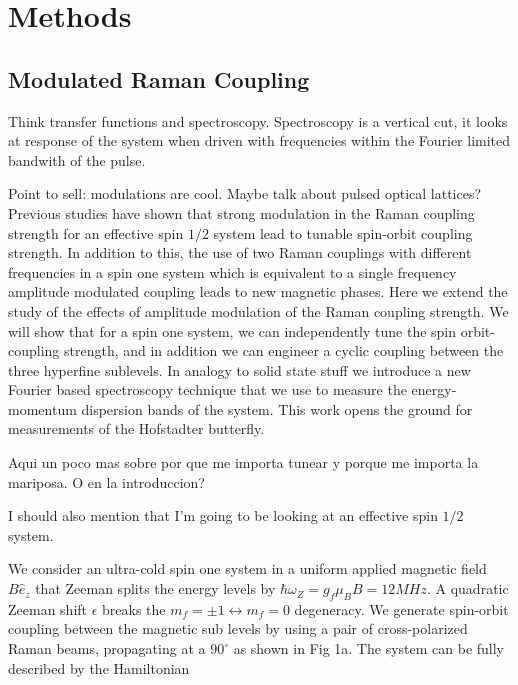 \section{Methods}

 
\subsection{Modulated Raman Coupling}


Think transfer functions and spectroscopy. Spectroscopy is a vertical cut, it looks at response of the system when driven with frequencies within the Fourier limited bandwith of the pulse. 

Point to sell: modulations are cool. Maybe talk about pulsed optical lattices?
Previous studies have shown that strong modulation in the Raman coupling strength for an effective spin $1/2$ system lead to tunable spin-orbit coupling strength. In addition to this, the use of two Raman couplings with different frequencies in a spin one system which is equivalent to a single frequency amplitude modulated coupling leads to new magnetic phases. Here we extend the study of the effects of amplitude modulation of the Raman coupling strength. We will show that for a spin one system, we can independently  tune the spin orbit-coupling strength, and in addition we can engineer a cyclic coupling between the three hyperfine sublevels. In analogy to solid state stuff we introduce a new Fourier based spectroscopy technique that we use to measure the energy-momentum dispersion bands of the system. This work opens the ground for measurements of the Hofstadter butterfly. 

Aqui un poco mas sobre por que me importa tunear y porque me importa la mariposa. O en la introduccion?

I should also mention that I'm going to be looking at an effective spin $1/2$ system. 


We consider an ultra-cold spin one system in a uniform applied magnetic field $B\hat{e}_z$ that Zeeman splits the energy levels by $\hbar\omega_Z=g_f\mu_BB = 12 MHz$. A quadratic Zeeman shift $\epsilon$ breaks the $m_f=\pm1\leftrightarrow m_f=0$ degeneracy. We generate spin-orbit coupling between the magnetic sub levels by using a pair of cross-polarized Raman beams, propagating at a $90^{\circ}$ as shown in Fig 1a. The system can be fully described by the Hamiltonian

